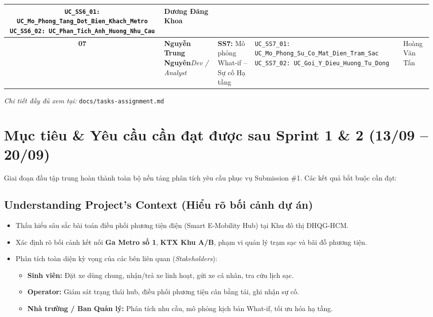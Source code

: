 \documentclass[11pt,a4paper]{article}
\begin{document}
{\begin{tabularx}{\textwidth}{|c|>{\raggedright\arraybackslash}p{2.6cm}|>{\raggedright\arraybackslash}p{3.2cm}|>{\raggedright\arraybackslash}X|>{\raggedright\arraybackslash}p{2.4cm}|}
  \texttt{UC\_SS6\_01: UC\_Mo\_Phong\_Tang\_Dot\_\allowbreak Bien\_Khach\_Metro}\newline
  \texttt{UC\_SS6\_02: UC\_Phan\_Tich\_Anh\_Huong\_\allowbreak Nhu\_Cau} &
  Dương Đăng Khoa \\
  \hline
  \textbf{07} &
  \textbf{Nguyễn Trung Nguyên}\newline\textit{Dev / Analyst} &
  \textbf{SS7:} Mô phỏng What-if -- Sự cố Hạ tầng &
  \texttt{UC\_SS7\_01: UC\_Mo\_Phong\_Su\_Co\_Mat\_\allowbreak Dien\_Tram\_Sac}\newline
  \texttt{UC\_SS7\_02: UC\_Goi\_Y\_Dieu\_Huong\_\allowbreak Tu\_Dong} &
  Hoàng Văn Tấn \\
  \hline
\end{tabularx}
}

\vspace{4pt}
{\small\textit{Chi tiết đầy đủ xem tại:} \texttt{docs/tasks-assignment.md}}

\section{Mục tiêu \& Yêu cầu cần đạt được sau Sprint 1 \& 2 (13/09 -- 20/09)}

Giai đoạn đầu tập trung hoàn thành toàn bộ nền tảng phân tích yêu cầu phục vụ Submission \#1. Các kết quả bắt buộc cần đạt:

\subsection{Understanding Project's Context (Hiểu rõ bối cảnh dự án)}

\begin{itemize}[leftmargin=2em, itemsep=2pt]
  \item Thấu hiểu sâu sắc bài toán điều phối phương tiện điện (Smart E-Mobility Hub) tại Khu đô thị ĐHQG-HCM.
  \item Xác định rõ bối cảnh kết nối \textbf{Ga Metro số 1}, \textbf{KTX Khu A/B}, phạm vi quản lý trạm sạc và bãi đỗ phương tiện.
  \item Phân tích toàn diện kỳ vọng của các bên liên quan (\textit{Stakeholders}):
    \begin{itemize}[leftmargin=1.5em, itemsep=1pt]
      \item \textbf{Sinh viên:} Đặt xe dùng chung, nhận/trả xe linh hoạt, gửi xe cá nhân, tra cứu lịch sạc.
      \item \textbf{Operator:} Giám sát trạng thái hub, điều phối phương tiện cân bằng tải, ghi nhận sự cố.
      \item \textbf{Nhà trường / Ban Quản lý:} Phân tích nhu cầu, mô phỏng kịch bản What-if, tối ưu hóa hạ tầng.
    \end{itemize}
\end{itemize}
\end{document}
